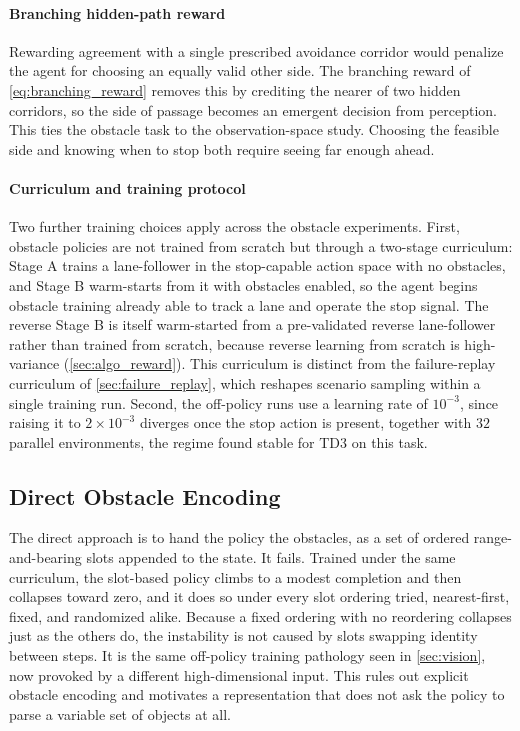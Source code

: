 \paragraph{Branching hidden-path reward}
Rewarding agreement with a single prescribed avoidance corridor would penalize the agent for choosing an equally valid other side. The branching reward of \cref{eq:branching_reward} removes this by crediting the nearer of two hidden corridors, so the side of passage becomes an emergent decision from perception. This ties the obstacle task to the observation-space study. Choosing the feasible side and knowing when to stop both require seeing far enough ahead.

\paragraph{Curriculum and training protocol}
Two further training choices apply across the obstacle experiments. First, obstacle policies are not trained from scratch but through a two-stage curriculum: Stage A trains a lane-follower in the stop-capable action space with no obstacles, and Stage B warm-starts from it with obstacles enabled, so the agent begins obstacle training already able to track a lane and operate the stop signal. The reverse Stage B is itself warm-started from a pre-validated reverse lane-follower rather than trained from scratch, because reverse learning from scratch is high-variance (\cref{sec:algo_reward}). This curriculum is distinct from the failure-replay curriculum of \cref{sec:failure_replay}, which reshapes scenario sampling within a single training run. Second, the off-policy runs use a learning rate of $10^{-3}$, since raising it to $2\times10^{-3}$ diverges once the stop action is present, together with $32$ parallel environments, the regime found stable for TD3 on this task.

\subsection{Direct Obstacle Encoding}

The direct approach is to hand the policy the obstacles, as a set of ordered range-and-bearing slots appended to the state. It fails. Trained under the same curriculum, the slot-based policy climbs to a modest completion and then collapses toward zero, and it does so under every slot ordering tried, nearest-first, fixed, and randomized alike. Because a fixed ordering with no reordering collapses just as the others do, the instability is not caused by slots swapping identity between steps. It is the same off-policy training pathology seen in \cref{sec:vision}, now provoked by a different high-dimensional input. This rules out explicit obstacle encoding and motivates a representation that does not ask the policy to parse a variable set of objects at all.

